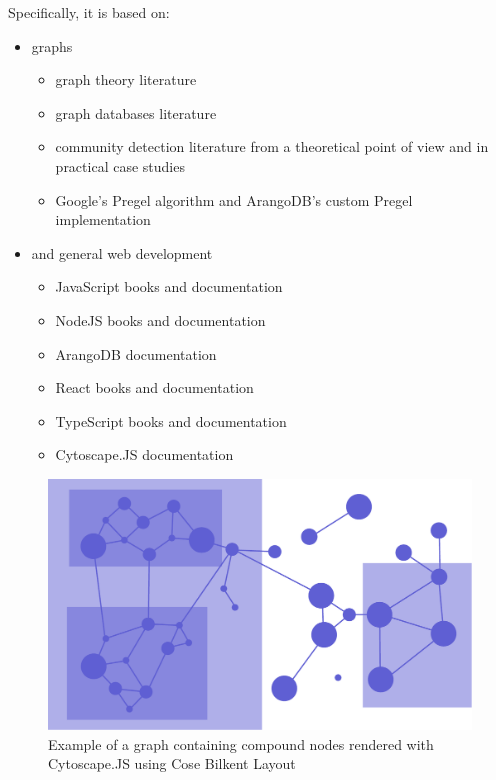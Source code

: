 Specifically, it is based on:
 \begin{itemize}[noitemsep]
	\item graphs
		 \begin{itemize}[noitemsep]
			\item graph theory literature
			\item graph databases literature
			\item community detection literature from a theoretical point of view
				and in practical case studies
			\item \gls{Google}'s \gls{Pregel} algorithm and ArangoDB's custom \gls{Pregel} implementation 
		\end{itemize}
	\item and general web development
		 \begin{itemize}[noitemsep]
			\item JavaScript books and documentation
			\item NodeJS books and documentation
			\item ArangoDB documentation
			\item React books and documentation
			\item TypeScript books and documentation
			\item \gls{Cytoscape.JS} documentation
		\end{itemize}
\end{itemize}
 
\begin{figure}[H]%
	\centering%
	\includegraphics[width=1\textwidth]{images/chapter1/CytoscapeJSCoseBilkent.pdf}%
	\caption[Example of a graph containing compound nodes rendered with CytoscapeJS using Cose Bilkent Layout]{Example of a graph containing compound nodes rendered with \gls{Cytoscape.JS} using Cose Bilkent Layout}%
	\label{fig:CytoscapeJSCoseBilkent}%
\end{figure}%

